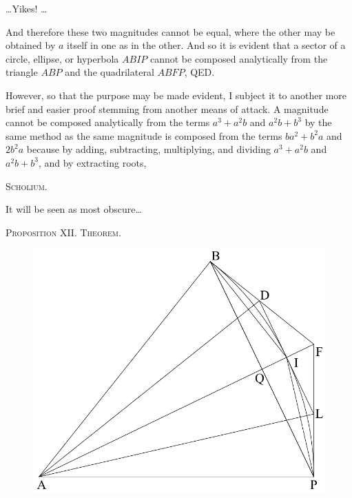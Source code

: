 \documentclass[11pt,letterpaper]{book}
\begin{document}
\noindent\ldots Yikes! \ldots

\noindent And therefore these two magnitudes cannot be equal, where the other may be
obtained by $a$ itself in one as in the other. And so it is evident that a
sector of a circle, ellipse, or hyperbola $ABIP$ cannot be composed analytically
from the triangle $ABP$ and the quadrilateral $ABFP$, QED.

However, so that the purpose may be made evident, I subject it to another more
brief and easier proof stemming from another means of attack. A magnitude cannot
be composed analytically from the terms $a^{3}+a^{2}b$ and $a^{2}b+b^{3}$ by the
same method as the same magnitude is composed from the terms $ba^{2}+b^{2}a$ and
$2b^{2}a$ because by adding, subtracting, multiplying, and dividing
$a^{3}+a^{2}b$ and $a^{2}b+b^{3}$, and by extracting roots, 


\begin{samepage}
\begin{center}
\large\textsc{Scholium.}
\end{center}

It will be seen as most obscure\ldots
\end{samepage}

\begin{center}
\large\textsc{Proposition XII. Theorem.}
\end{center}

\begin{figure}[h]
\includegraphics[scale=0.95]{vera_i}
\end{figure}
\end{document}
